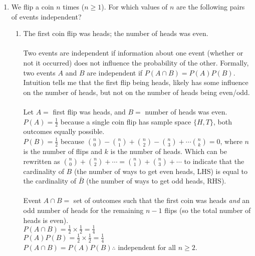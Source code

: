 \documentclass[10pt,a4paper,final]{article}
\begin{document}
\begin{enumerate}
\item %
We flip a coin $n$ times ($n \geq 1$). For which values of $n$ are the following pairs of events independent?
\begin{enumerate}
\item The first coin flip was heads; the number of heads was even. \\
\\
Two events are independent if information about one event (whether or not it occurred)
does not influence the probability of the other. Formally, two events $A$ and $B$
are independent if $P(A \cap B) = P(A)P(B)$.\\
Intuition tells me that the first flip being heads, likely has some influence on the number of heads,
but not on the number of heads being even/odd.\\
\\
Let $A = $ first flip was heads, and $B = $ number of heads was even.\\
$P(A) = \frac{1}{2}$ because a single coin flip has sample space $\{H,T\}$, both outcomes equally possible. \\
$P(B) = \frac{1}{2}$ because $\binom{n}{0} - \binom{n}{1} + \binom{n}{2} - \binom{n}{3} + \cdots \binom{n}{k}= 0$, where $n$ is the number of flips and $k$ is the number of heads.
Which can be rewritten as $\binom{n}{0} + \binom{n}{2} + \cdots = \binom{n}{1} + \binom{n}{3} + \cdots$
to indicate that the cardinality of $B$ (the number of ways to get even heads, LHS) is equal to the
cardinality of $\bar{B}$ (the number of ways to get odd heads, RHS).\\
\\
Event $A \cap B = $ set of outcomes such that the first coin was heads \emph{and} an odd number of
heads for the remaining $n-1$ flips (so the total number of heads is even).\\
$P(A \cap B) = \frac{1}{2} \times \frac{1}{2} = \frac{1}{4}$\\
$P(A)P(B) = \frac{1}{2} \times \frac{1}{2} = \frac{1}{4}$\\
$P(A \cap B) = P(A)P(B) \therefore$ independent for all $n \geq 2$.


\end{enumerate}
\end{enumerate}
\end{document}
